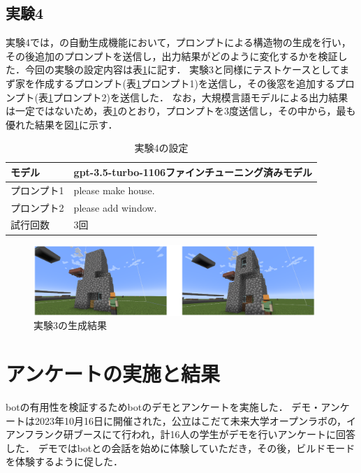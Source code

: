\subsection{実験4}\label{sec:ex4}
実験4では，{\mason}の自動生成機能において，プロンプトによる構造物の生成を行い，その後追加のプロンプトを送信し，出力結果がどのように変化するかを検証した．今回の実験の設定内容は表\ref{tab:setting4}に記す．
実験3と同様にテストケースとしてまず家を作成するプロンプト(表\ref{tab:setting4}プロンプト1)を送信し，その後窓を追加するプロンプト(表\ref{tab:setting4}プロンプト2)を送信した．
なお，大規模言語モデルによる出力結果は一定ではないため，表\ref{tab:setting4}のとおり，プロンプトを3度送信し，その中から，最も優れた結果を図\ref{fig:add_window2}に示す．

\begin{table}[H]
    \caption{実験4の設定}\label{tab:setting4}
    \centering
    \begin{tabular}{ll}
        \hline \hline
        モデル & gpt-3.5-turbo-1106ファインチューニング済みモデル \\
        \hline
        プロンプト1 & please make house. \\
        \hline
        プロンプト2 & please add window. \\
        \hline
        試行回数 & 3回 \\
        \hline
    \end{tabular}
\end{table}

\begin{figure}[H]
    \centering
    \includegraphics[width=0.95\textwidth]{fig/add_window2.PNG}
    \caption{実験3の生成結果}
    \label{fig:add_window2}
\end{figure}

\section{アンケートの実施と結果}\label{sec:survey_result}
botの有用性を検証するためbotのデモとアンケートを実施した．
デモ・アンケートは2023年10月16日に開催された，公立はこだて未来大学オープンラボの，イアンフランク研ブースにて行われ，計16人の学生がデモを行いアンケートに回答した．
デモではbotとの会話を始めに体験していただき，その後，ビルドモードを体験するように促した．


